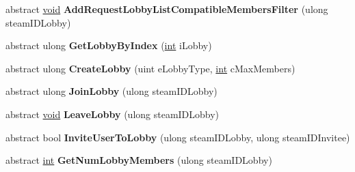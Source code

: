 \begin{DoxyCompactItemize}
\item 
\hypertarget{classValve_1_1Steamworks_1_1ISteamMatchmaking_a54fe1f635b5e6d592a06faff52ce3df6}{}abstract \hyperlink{SDL__audio_8h_a52835ae37c4bb905b903cbaf5d04b05f}{void} {\bfseries Add\+Request\+Lobby\+List\+Compatible\+Members\+Filter} (ulong steam\+I\+D\+Lobby)\label{classValve_1_1Steamworks_1_1ISteamMatchmaking_a54fe1f635b5e6d592a06faff52ce3df6}

\item 
\hypertarget{classValve_1_1Steamworks_1_1ISteamMatchmaking_a760332baefc766d8d82d5bec89bdbc7b}{}abstract ulong {\bfseries Get\+Lobby\+By\+Index} (\hyperlink{SDL__thread_8h_a6a64f9be4433e4de6e2f2f548cf3c08e}{int} i\+Lobby)\label{classValve_1_1Steamworks_1_1ISteamMatchmaking_a760332baefc766d8d82d5bec89bdbc7b}

\item 
\hypertarget{classValve_1_1Steamworks_1_1ISteamMatchmaking_a53fa7cfbec4cabb5b98a67fe932c3ab5}{}abstract ulong {\bfseries Create\+Lobby} (uint e\+Lobby\+Type, \hyperlink{SDL__thread_8h_a6a64f9be4433e4de6e2f2f548cf3c08e}{int} c\+Max\+Members)\label{classValve_1_1Steamworks_1_1ISteamMatchmaking_a53fa7cfbec4cabb5b98a67fe932c3ab5}

\item 
\hypertarget{classValve_1_1Steamworks_1_1ISteamMatchmaking_aaa8703ea4e40e3a23edd8881f828a455}{}abstract ulong {\bfseries Join\+Lobby} (ulong steam\+I\+D\+Lobby)\label{classValve_1_1Steamworks_1_1ISteamMatchmaking_aaa8703ea4e40e3a23edd8881f828a455}

\item 
\hypertarget{classValve_1_1Steamworks_1_1ISteamMatchmaking_aac62c6dfe4a84f9ab54cc3c2b9a84e49}{}abstract \hyperlink{SDL__audio_8h_a52835ae37c4bb905b903cbaf5d04b05f}{void} {\bfseries Leave\+Lobby} (ulong steam\+I\+D\+Lobby)\label{classValve_1_1Steamworks_1_1ISteamMatchmaking_aac62c6dfe4a84f9ab54cc3c2b9a84e49}

\item 
\hypertarget{classValve_1_1Steamworks_1_1ISteamMatchmaking_a45facdfabfd56030979e8fbb50b5e6c7}{}abstract bool {\bfseries Invite\+User\+To\+Lobby} (ulong steam\+I\+D\+Lobby, ulong steam\+I\+D\+Invitee)\label{classValve_1_1Steamworks_1_1ISteamMatchmaking_a45facdfabfd56030979e8fbb50b5e6c7}

\item 
\hypertarget{classValve_1_1Steamworks_1_1ISteamMatchmaking_a71acc626dbe4ecf812fdbe6c47b9cdc7}{}abstract \hyperlink{SDL__thread_8h_a6a64f9be4433e4de6e2f2f548cf3c08e}{int} {\bfseries Get\+Num\+Lobby\+Members} (ulong steam\+I\+D\+Lobby)\label{classValve_1_1Steamworks_1_1ISteamMatchmaking_a71acc626dbe4ecf812fdbe6c47b9cdc7}


\end{DoxyCompactItemize}
